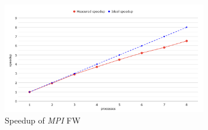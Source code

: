 \begin{figure}[h!]
\centering                                                                        
\includegraphics[width=3.5in]{diagrams/mpi-speedup}
\captionsetup{justification=centering}                                                                                                                                   
\caption{Speedup of \emph{MPI} FW}                                                                                                                                            
\label{fig:mpi-speedup}                                                                                                                                                           
\end{figure}

